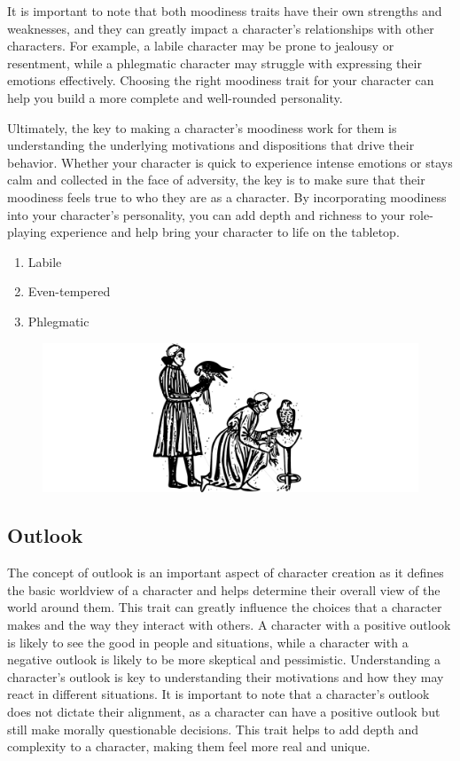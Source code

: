 \documentclass[12pt]{book}  %
\begin{document}
It is important to note that both moodiness traits have their own strengths and weaknesses, and they can greatly impact a character's relationships with other characters. For example, a labile character may be prone to jealousy or resentment, while a phlegmatic character may struggle with expressing their emotions effectively. Choosing the right moodiness trait for your character can help you build a more complete and well-rounded personality.

Ultimately, the key to making a character's moodiness work for them is understanding the underlying motivations and dispositions that drive their behavior. Whether your character is quick to experience intense emotions or stays calm and collected in the face of adversity, the key is to make sure that their moodiness feels true to who they are as a character. By incorporating moodiness into your character's personality, you can add depth and richness to your role-playing experience and help bring your character to life on the tabletop.

\begin{enumerate}
    \item Labile
    \item Even-tempered
    \item Phlegmatic
\end{enumerate}

\begin{figure}[h]
    \centering
    \includegraphics[width=\textwidth]{./images/personality03.pdf}
\end{figure}

\subsection{\textbf{Outlook}}

The concept of outlook is an important aspect of character creation as it defines the basic worldview of a character and helps determine their overall view of the world around them. This trait can greatly influence the choices that a character makes and the way they interact with others. A character with a positive outlook is likely to see the good in people and situations, while a character with a negative outlook is likely to be more skeptical and pessimistic. Understanding a character's outlook is key to understanding their motivations and how they may react in different situations. It is important to note that a character's outlook does not dictate their alignment, as a character can have a positive outlook but still make morally questionable decisions. This trait helps to add depth and complexity to a character, making them feel more real and unique.
\end{document}
